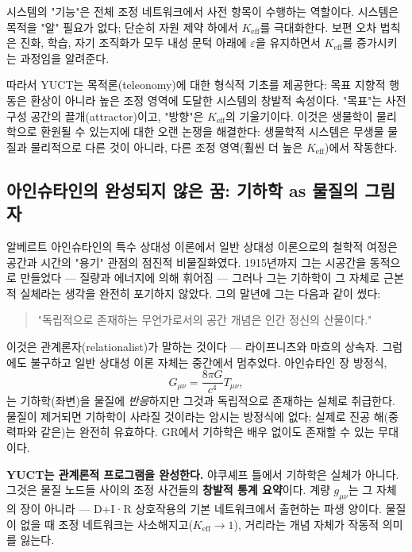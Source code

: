 \documentclass[12pt,a4paper]{article}
\begin{document}
	시스템의 "기능"은 전체 조정 네트워크에서 사전 항목이 수행하는 역할이다. 시스템은 목적을 "알" 필요가 없다; 단순히 자원 제약 하에서 \(K_{\mathrm{eff}}\)를 극대화한다. 보편 오차 법칙은 진화, 학습, 자기 조직화가 모두 내성 문턱 아래에 \(\varepsilon\)을 유지하면서 \(K_{\mathrm{eff}}\)를 증가시키는 과정임을 알려준다.
	
	따라서 YUCT는 목적론(teleonomy)에 대한 형식적 기초를 제공한다: 목표 지향적 행동은 환상이 아니라 높은 조정 영역에 도달한 시스템의 창발적 속성이다. "목표"는 사전 구성 공간의 끌개(attractor)이고, "방향"은 \(K_{\mathrm{eff}}\)의 기울기이다. 이것은 생물학이 물리학으로 환원될 수 있는지에 대한 오랜 논쟁을 해결한다: 생물학적 시스템은 무생물 물질과 물리적으로 다른 것이 아니라, 다른 조정 영역(훨씬 더 높은 \(K_{\mathrm{eff}}\))에서 작동한다.
	
	\subsection{아인슈타인의 완성되지 않은 꿈: 기하학 as 물질의 그림자}
	
	알베르트 아인슈타인의 특수 상대성 이론에서 일반 상대성 이론으로의 철학적 여정은 공간과 시간의 "용기" 관점의 점진적 비물질화였다. 1915년까지 그는 시공간을 동적으로 만들었다 — 질량과 에너지에 의해 휘어짐 — 그러나 그는 기하학이 그 자체로 근본적 실체라는 생각을 완전히 포기하지 않았다. 그의 말년에 그는 다음과 같이 썼다:
	
	\begin{quote}
		"독립적으로 존재하는 무언가로서의 공간 개념은 인간 정신의 산물이다."
	\end{quote}
	
	이것은 관계론자(relationalist)가 말하는 것이다 — 라이프니츠와 마흐의 상속자. 그럼에도 불구하고 일반 상대성 이론 자체는 중간에서 멈추었다. 아인슈타인 장 방정식,
	\[
	G_{\mu\nu} = \frac{8\pi G}{c^4} T_{\mu\nu},
	\]
	는 기하학(좌변)을 물질에 \emph{반응}하지만 그것과 독립적으로 존재하는 실체로 취급한다. 물질이 제거되면 기하학이 사라질 것이라는 암시는 방정식에 없다; 실제로 진공 해(중력파와 같은)는 완전히 유효하다. GR에서 기하학은 배우 없이도 존재할 수 있는 무대이다.
	
	\textbf{YUCT는 관계론적 프로그램을 완성한다.} 야쿠셰프 틀에서 기하학은 실체가 아니다. 그것은 물질 노드들 사이의 조정 사건들의 \textbf{창발적 통계 요약}이다. 계량 \(g_{\mu\nu}\)는 그 자체의 장이 아니라 — D+I·R 상호작용의 기본 네트워크에서 출현하는 파생 양이다. 물질이 없을 때 조정 네트워크는 사소해지고(\(K_{\mathrm{eff}} \to 1\)), 거리라는 개념 자체가 작동적 의미를 잃는다.
	
\end{document}
